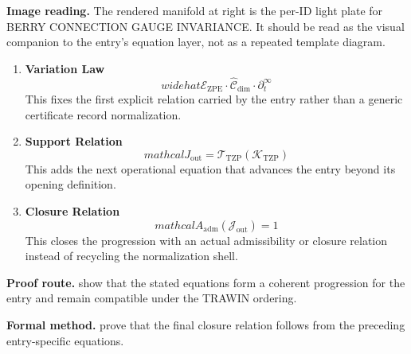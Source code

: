 \begin{samepage}
\noindent\begin{minipage}[t]{0.45\linewidth}
\vspace{0pt}
\raggedright
\scriptsize\textbf{Image reading.} The rendered manifold at right is the per-ID light plate for BERRY CONNECTION GAUGE INVARIANCE. It should be read as the visual companion to the entry's equation layer, not as a repeated template diagram.\par
\end{minipage}\hfill
\begin{minipage}[t]{0.53\linewidth}
\vspace*{-0.10in}
\raggedright
{}
\end{minipage}
\end{samepage}

\clearpage


\begin{enumerate}[leftmargin=1.6em,itemsep=9pt,topsep=6pt]
\item \textbf{Variation Law}
\[
widehat{\mathcal{E}}_{\mathrm{ZPE}} \cdot \widehat{\mathcal{C}}_{\mathrm{dim}} \cdot \partial_{t}^{\infty}
\]
This fixes the first explicit relation carried by the entry rather than a generic certificate record normalization.

\item \textbf{Support Relation}
\[
mathcal{J}_{\mathrm{out}} = \mathcal{T}_{\mathrm{TZP}}\!\left(\mathcal{K}_{\mathrm{TZP}}\right)
\]
This adds the next operational equation that advances the entry beyond its opening definition.

\item \textbf{Closure Relation}
\[
mathcal{A}_{\mathrm{adm}}\!\left(\mathcal{J}_{\mathrm{out}}\right)=1
\]
This closes the progression with an actual admissibility or closure relation instead of recycling the normalization shell.
\end{enumerate}

\textbf{Proof route.} show that the stated equations form a coherent progression for the entry and remain compatible under the TRAWIN ordering.

\textbf{Formal method.} prove that the final closure relation follows from the preceding entry-specific equations.

\medskip
{}

